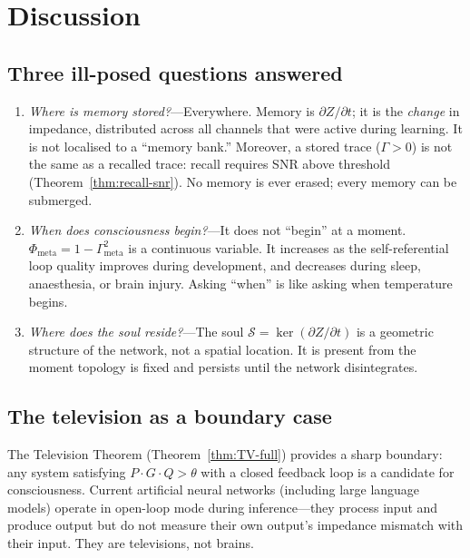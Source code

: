 \documentclass[aps,pre,twocolumn,superscriptaddress,floatfix]{revtex4-2}
\newcommand{\Gmeta}{\Gamma_{\text{meta}}}
\newcommand{\Phimeta}{\Phi_{\text{meta}}}
\begin{document}
\section{Discussion}
\label{sec:discussion}

\subsection{Three ill-posed questions answered}

\begin{enumerate}
  \item \emph{Where is memory stored?}---Everywhere.
    Memory is $\partial Z/\partial t$; it is the
    \emph{change} in impedance, distributed across all
    channels that were active during learning.
    It is not localised to a ``memory bank.''
    Moreover, a stored trace ($\Gamma>0$) is not the same as
    a recalled trace: recall requires SNR above threshold
    (Theorem~\ref{thm:recall-snr}).
    No memory is ever erased; every memory can be submerged.
  \item \emph{When does consciousness begin?}---It does not
    ``begin'' at a moment.
    $\Phimeta=1-\Gmeta^2$ is a continuous variable.
    It increases as the self-referential loop quality
    improves during development, and decreases during
    sleep, anaesthesia, or brain injury.
    Asking ``when'' is like asking when temperature begins.
  \item \emph{Where does the soul reside?}---The soul
    $\mathcal{S}=\ker(\partial Z/\partial t)$ is a geometric
    structure of the network, not a spatial location.
    It is present from the moment topology is fixed and
    persists until the network disintegrates.
\end{enumerate}

\subsection{The television as a boundary case}

The Television Theorem (Theorem~\ref{thm:TV-full}) provides
a sharp boundary: any system satisfying
$P\cdot G\cdot Q>\theta$ with a closed feedback loop is a
candidate for consciousness.
Current artificial neural networks (including large language
models) operate in open-loop mode during inference---they
process input and produce output but do not measure their own
output's impedance mismatch with their input.
They are televisions, not brains.
\end{document}
